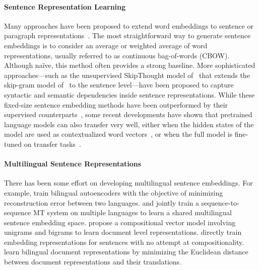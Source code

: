 \documentclass[11pt,a4paper]{article}
\begin{document}
\paragraph{Sentence Representation Learning}
Many approaches have been proposed to extend word embeddings to sentence or paragraph representations~\cite{le2014distributed,wieting2015towards,arora2016asimple}. The most straightforward way to generate sentence embeddings is to consider an average or weighted average of word representations, usually referred to as continuous bag-of-words (CBOW). Although na\"ive, this method often provides a strong baseline. More sophisticated approaches---such as the un\-supervised SkipThought model of~\citet{kiros2015skip} that extends the skip-gram model of~\citet{mikolov2013distributed} to the sentence level---have been proposed to capture syntactic and semantic depend\-encies inside sentence representations. While these fixed-size sentence embedding methods have been outperformed by their supervised counterparts~\cite{conneau2017supervised,subramanian2018learning}, some recent developments have shown that pretrained language models can also transfer very well, either when the hidden states of the model are used as contextualized word vectors~\cite{peters2018deep}, or when the full model is fine-tuned on transfer tasks~\cite{radford2018improving,howard2018fine}.


\paragraph{Multilingual Sentence Representations}
There has been some effort on developing multilingual sentence embeddings.
For example, \citet{Chandar:2013:multlin_deep} train bi\-lingual auto\-encoders with the objective of minimizing reconstruction error between two languages.  \citet{Schwenk:2017:repl4nlp} and \citet{epsana:2017:ieee_embed_mine} jointly train a sequence-to-sequence MT system on multiple languages to learn a shared multilingual sentence embedding space. \citet{Hermann:2014:acl_multling} propose a compositional vector model involving unigrams and bigrams to learn document level representations.
\citet{Pham:2015:multling} directly train embedding representations for sentences with no attempt at compositionality. \citet{Zhou:2016:acl_crossling} learn bilingual document representations by minimizing the Euclidean distance between document representations and their translations.
\end{document}
